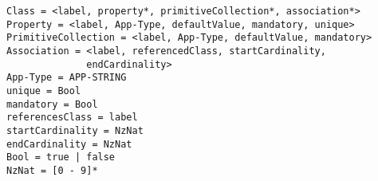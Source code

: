 \documentclass[11pt]{article}
\begin{document}
\begin{verbatim}
Class = <label, property*, primitiveCollection*, association*>
Property = <label, App-Type, defaultValue, mandatory, unique>
PrimitiveCollection = <label, App-Type, defaultValue, mandatory>
Association = <label, referencedClass, startCardinality, 
              endCardinality>
App-Type = APP-STRING 
unique = Bool
mandatory = Bool
referencesClass = label
startCardinality = NzNat
endCardinality = NzNat
Bool = true | false
NzNat = [0 - 9]*
\end{verbatim}
\end{document}
